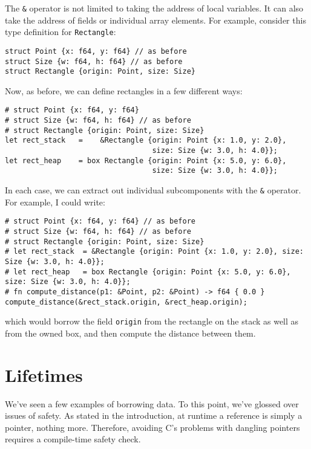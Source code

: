 \documentclass[]{article}
\begin{document}
The \texttt{\&} operator is not limited to taking the address of local
variables. It can also take the address of fields or individual array
elements. For example, consider this type definition for
\texttt{Rectangle}:

\begin{verbatim}
struct Point {x: f64, y: f64} // as before
struct Size {w: f64, h: f64} // as before
struct Rectangle {origin: Point, size: Size}
\end{verbatim}

Now, as before, we can define rectangles in a few different ways:

\begin{verbatim}
# struct Point {x: f64, y: f64}
# struct Size {w: f64, h: f64} // as before
# struct Rectangle {origin: Point, size: Size}
let rect_stack   =    &Rectangle {origin: Point {x: 1.0, y: 2.0},
                                  size: Size {w: 3.0, h: 4.0}};
let rect_heap    = box Rectangle {origin: Point {x: 5.0, y: 6.0},
                                  size: Size {w: 3.0, h: 4.0}};
\end{verbatim}

In each case, we can extract out individual subcomponents with the
\texttt{\&} operator. For example, I could write:

\begin{verbatim}
# struct Point {x: f64, y: f64} // as before
# struct Size {w: f64, h: f64} // as before
# struct Rectangle {origin: Point, size: Size}
# let rect_stack  = &Rectangle {origin: Point {x: 1.0, y: 2.0}, size: Size {w: 3.0, h: 4.0}};
# let rect_heap   = box Rectangle {origin: Point {x: 5.0, y: 6.0}, size: Size {w: 3.0, h: 4.0}};
# fn compute_distance(p1: &Point, p2: &Point) -> f64 { 0.0 }
compute_distance(&rect_stack.origin, &rect_heap.origin);
\end{verbatim}

which would borrow the field \texttt{origin} from the rectangle on the
stack as well as from the owned box, and then compute the distance
between them.

\section{Lifetimes}\label{lifetimes}

We've seen a few examples of borrowing data. To this point, we've
glossed over issues of safety. As stated in the introduction, at runtime
a reference is simply a pointer, nothing more. Therefore, avoiding C's
problems with dangling pointers requires a compile-time safety check.
\end{document}
